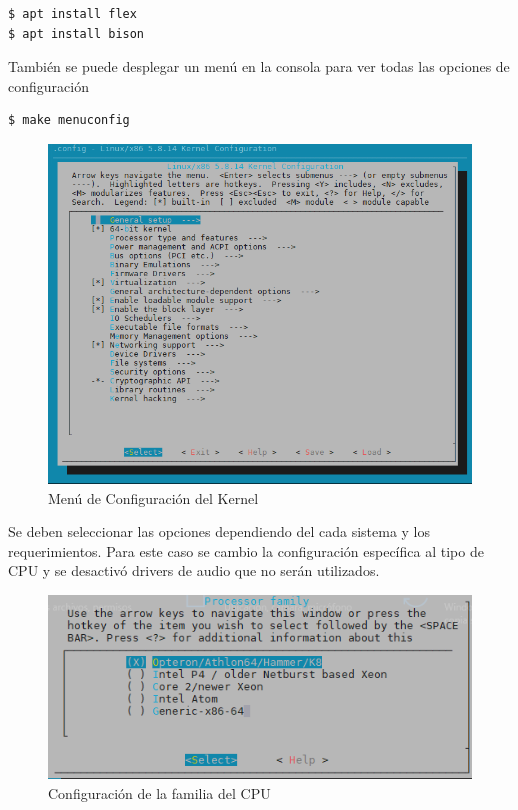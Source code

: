 \documentclass[12pt]{article}
\begin{document}
\begin{lstlisting}[frame=single]
$ apt install flex
$ apt install bison
\end{lstlisting}

También se puede desplegar un menú en la consola para ver todas las opciones de configuración 
\begin{lstlisting}[frame=single]
$ make menuconfig
\end{lstlisting}

\newpage
\begin{figure}[!h]
   \centering
   \includegraphics[scale=.39]{imgs/config_kernel2.png}
   \caption{Menú de Configuración del Kernel}
   \label{fig3}
\end{figure}

Se deben seleccionar las opciones dependiendo del cada sistema y los requerimientos. Para este caso se cambio la configuración específica al tipo de CPU y se desactivó drivers de audio que no serán utilizados.

\begin{figure}[!h]
   \centering
   \includegraphics[scale=.40]{imgs/conf_kernel3.png}
   \caption{Configuración de la familia del CPU}
   \label{fig4}
\end{figure}
\end{document}
